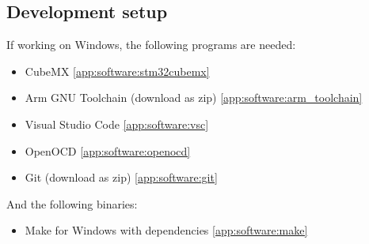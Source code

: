 \begin{appendices}


\section{Development setup} \label{app:devsetup}
If working on Windows, the following programs are needed:
\begin{itemize}
    \item CubeMX \ref{app:software:stm32cubemx}
    \item Arm GNU Toolchain (download as zip) \ref{app:software:arm_toolchain}
    \item Visual Studio Code \ref{app:software:vsc}
    \item OpenOCD \ref{app:software:openocd}
    \item Git (download as zip) \ref{app:software:git}
\end{itemize}

And the following binaries:
\begin{itemize}
    \item Make for Windows with dependencies \ref{app:software:make}
\end{itemize}


\end{appendices}
